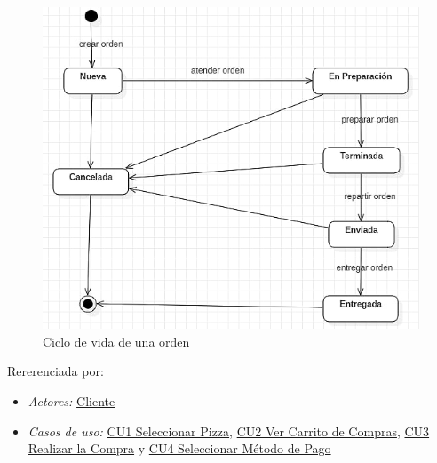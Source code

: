\begin{figure}[h]
	
	\begin{center}				
		
		\includegraphics[scale=0.50]{imagenes/CiclosDeVida/cv-Orden.png}
		\caption{Ciclo de vida de una orden}
		\label{fig:CV:Orden}
		
	\end{center}
	
\end{figure}
		\noindent Rererenciada por: 
		
			\begin{itemize}

				\item \textit{Actores:} \hyperlink{A:Cliente}{Cliente}

				\item \textit{Casos de uso:} \hyperlink{CU1}{CU1 Seleccionar Pizza}, \hyperlink{CU2}{CU2 Ver Carrito de Compras}, \hyperlink{CU3}{CU3 Realizar la Compra} y \hyperlink{CU4}{CU4 Seleccionar Método de Pago}

			\end{itemize}

